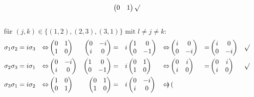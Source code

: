 \documentclass{HM}
\begin{document}
\begin{enumerate}
$$\begin{pmatrix}
0&1
\end{pmatrix} \surd$$\\
für $(j,k)\in\lbrace(1,2),(2,3),(3,1)\rbrace \text{ mit } l\neq j\neq k$:
\begin{align*}
\sigma_1\sigma_2&=i\sigma_3 &\Leftrightarrow& \begin{pmatrix}
0&1\\
1&0
\end{pmatrix}&\begin{pmatrix}
0&-i\\
i&0
\end{pmatrix}&=&i&\begin{pmatrix}
1&0\\
0&-1
\end{pmatrix}&\Leftrightarrow& \begin{pmatrix}
i&0\\
0&-i
\end{pmatrix}&=&\begin{pmatrix}
i&0\\
0&-i
\end{pmatrix} &\surd\\
\sigma_2\sigma_3&=i\sigma_1 &\Leftrightarrow& \begin{pmatrix}
0&-i\\
i&0
\end{pmatrix}&\begin{pmatrix}
1&0\\
0&-1
\end{pmatrix}&=&i&\begin{pmatrix}
0&1\\
1&0
\end{pmatrix}&\Leftrightarrow& \begin{pmatrix}
0&i\\
i&0
\end{pmatrix}&=&\begin{pmatrix}
0&i\\
i&0
\end{pmatrix} &\surd\\
\sigma_3\sigma_1&=i\sigma_2 &\Leftrightarrow& \begin{pmatrix}
1&0\\
0&1
\end{pmatrix}&\begin{pmatrix}
0&1\\
1&0
\end{pmatrix}&=&i&\begin{pmatrix}
0&-i\\
i&0
\end{pmatrix}&\Leftrightarrow& \begin{pmatrix}

\end{pmatrix}
\end{align*}
\end{enumerate}
\end{document}
